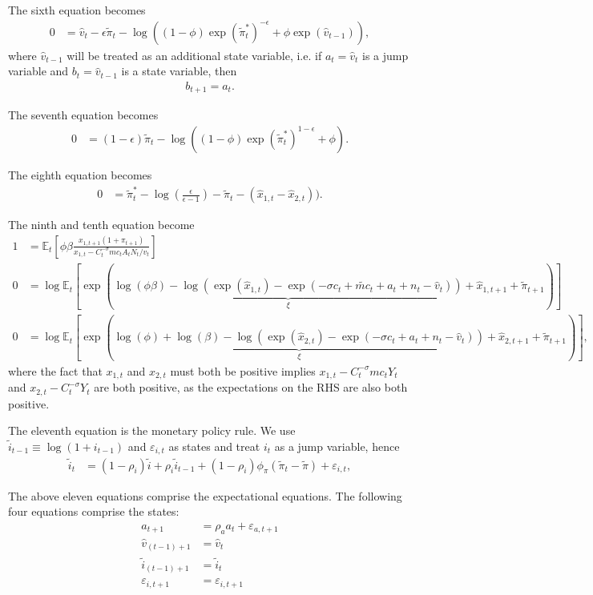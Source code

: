 \documentclass[12 pt, oneside]{article}
\theoremstyle{definition}
\theoremstyle{definition}
\theoremstyle{definition}
\newcommand{\E}{\mathbb{E}}
\newcommand{\fd}{\vspace{2.5mm}}
\begin{document}
The sixth equation becomes
\begin{align*}
  0 & = \hat{v}_t - \epsilon \tilde{\pi}_t - \log((1 - \phi) \exp(\tilde{\pi}_t^*)^{ - \epsilon} + \phi \exp(\hat{v}_{t - 1})),
\end{align*}
where $\hat{v}_{t - 1}$ will be treated as an additional state variable, i.e. if $a_t = \hat{v}_t$ is a jump variable and $b_t = \hat{v}_{t - 1}$
is a state variable, then
\begin{align*}
  b_{t + 1} = a_t.
\end{align*}

The seventh equation becomes
\begin{align*}
  0 & = (1 - \epsilon)\tilde{\pi}_t - \log((1 - \phi) \exp(\tilde{\pi}_t^*)^{1 - \epsilon} + \phi).
\end{align*}

The eighth equation becomes
\begin{align*}
  0 & = \tilde{\pi}_t^* - \log\left(\frac{\epsilon}{\epsilon - 1}\right) - \tilde{\pi}_t - (\hat{x}_{1, t} - \hat{x}_{2, t})).
\end{align*}

The ninth and tenth equation become
\begin{align*}
  1 & = \E_t\left[\phi \beta\frac{x_{1, t + 1}(1 + \pi_{t + 1})}{x_{1, t} - C_t^{-\sigma} mc_t A_tN_t / v_t}\right]\\
  0 & = \log\E_t\left[\exp\left(\underbrace{\log(\phi\beta)   - \log(\exp(\hat{x}_{1, t}) - \exp(-\sigma c_t + \tilde{mc}_t + a_t + n_t - \hat{v}_t))}_{\xi} + \hat{x}_{1, t + 1} + \tilde{\pi}_{t + 1}\right)\right]\\
  0 & = \log\E_t\left[\exp\left(\underbrace{\log(\phi) + \log(\beta)  - \log(\exp(\hat{x}_{2, t}) - \exp(-\sigma c_t + a_t + n_t - \hat{v}_t))}_{\xi} + \hat{x}_{2, t + 1} + \tilde{\pi}_{t + 1}\right)\right],
\end{align*}
where the fact that $x_{1,t}$ and $x_{2, t}$ must both be positive implies $x_{1, t} - C_t^{-\sigma} mc_t Y_t$ and $x_{2, t} - C_t^{-\sigma}Y_t$ are both positive, as the expectations on the RHS are also both positive.

\fd

The eleventh equation is the monetary policy rule. We use $\tilde{i}_{t - 1} \equiv \log(1 + i_{t - 1})$ and $\varepsilon_{i, t}$ as states and treat $i_t$ as a jump variable, hence
\begin{align*}
  \tilde{i}_t & = (1 - \rho_i) \tilde{i} + \rho_i \tilde{i}_{t - 1} + (1 - \rho_i)\phi_\pi (\tilde{\pi}_t - \tilde{\pi})  + \varepsilon_{i, t},
\end{align*}

The above eleven equations comprise the expectational equations. The following four equations comprise the states:
\begin{align*}
  a_{t + 1} & = \rho_a a_t + \varepsilon_{a, t + 1}\\
  \hat{v}_{(t - 1) + 1} & = \hat{v}_t\\
  \tilde{i}_{(t - 1) + 1} & = \tilde{i}_t\\
  \varepsilon_{i, t + 1} & = \varepsilon_{i, t + 1}
\end{align*}
\end{document}
